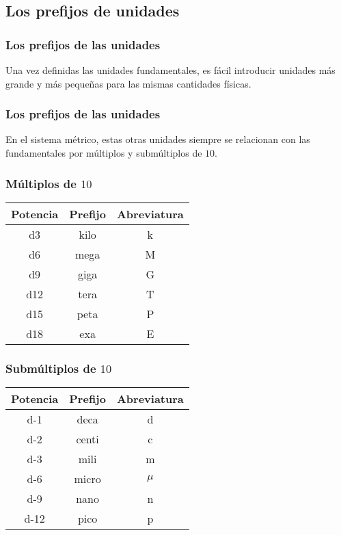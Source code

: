 \documentclass[14pt]{beamer}
\begin{document}
\subsection{Los prefijos de unidades}

\begin{frame}
\frametitle{Los prefijos de las unidades}
Una vez definidas las unidades fundamentales, es fácil introducir unidades más grande y más pequeñas para las mismas cantidades físicas.
\end{frame}
\begin{frame}
\frametitle{Los prefijos de las unidades}
En el sistema métrico, estas otras unidades siempre se relacionan con las fundamentales por múltiplos y submúltiplos de $10$.
\end{frame}
\begin{frame}
\frametitle{Múltiplos de $10$}
\begin{table}
\renewcommand{\arraystretch}{1}
\centering
\begin{tabular}{c | c | c}
Potencia & Prefijo & Abreviatura \\ \hline
\num{d3} & kilo & k \\ \hline
\num{d6} & mega & M \\ \hline
\num{d9} & giga & G \\ \hline
\num{d12} & tera & T \\ \hline
\num{d15} & peta & P \\ \hline
\num{d18} & exa & E \\ \hline
\end{tabular}
\end{table}
\end{frame}
\begin{frame}
\frametitle{Submúltiplos de $10$}
\begin{table}
\renewcommand{\arraystretch}{1}
\centering
\begin{tabular}{c | c | c}
Potencia & Prefijo & Abreviatura \\ \hline
\num{d-1} & deca & d \\ \hline
\num{d-2} & centi & c \\ \hline
\num{d-3} & mili & m \\ \hline
\num{d-6} & micro & $\mu$ \\ \hline
\num{d-9} & nano & n \\ \hline
\num{d-12} & pico & p \\ \hline
\end{tabular}
\end{table}
\end{frame}
\end{document}
